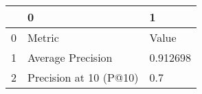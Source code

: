 \begin{tabular}{lll}
\toprule
{} &                       0 &         1 \\
\midrule
0 &                  Metric &     Value \\
1 &       Average Precision &  0.912698 \\
2 &  Precision at 10 (P@10) &       0.7 \\
\bottomrule
\end{tabular}
